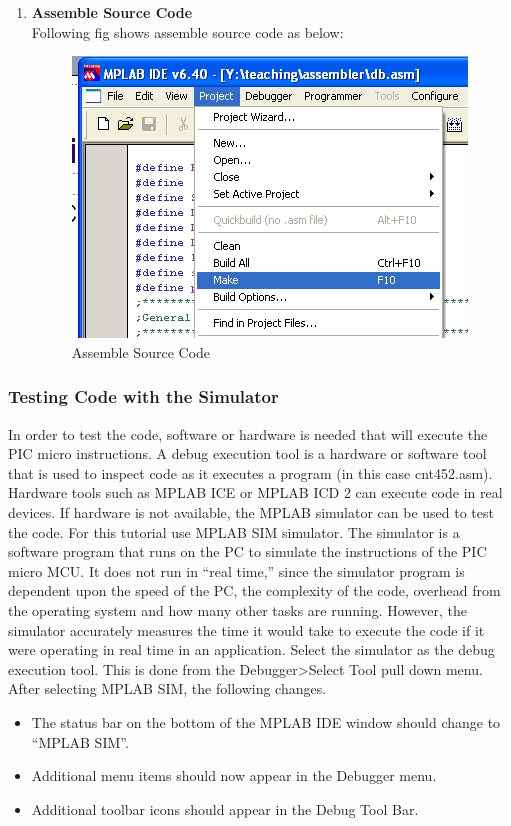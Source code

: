 \documentclass[12pt,a4paper,oneside,openright]{report}
\begin{document}
\begin{enumerate}
\item \textbf{Assemble Source Code}\\
Following fig shows assemble source code as below:
\begin{figure}[!h]
 \centering
 \includegraphics[width = .80\textwidth]{Figures/19.jpg}
 \caption{Assemble Source Code}
 \label{Assemble Source Code}
\end{figure}

\end{enumerate}
\subsubsection{Testing Code with the Simulator}
In order to test the code, software or hardware is needed that will execute the PIC micro instructions. A debug execution tool is a hardware or software tool that is used to inspect code as it executes a program (in this case cnt452.asm). Hardware tools such as MPLAB ICE or MPLAB ICD 2 can execute code in real devices. If hardware is not available, the MPLAB simulator can be used to test the code. For this tutorial use MPLAB SIM simulator. The simulator is a software program that runs on the PC to simulate the instructions of the PIC micro MCU. It does not run in “real time,” since the simulator program is dependent upon the speed of the PC, the complexity of the code, overhead from the operating system and how many other tasks are running. However, the simulator accurately measures the time it would take to execute the code if it were operating in real time in an application. Select the simulator as the debug execution tool. This is done from the Debugger>Select Tool pull down menu. After selecting MPLAB SIM, the following changes. 
\begin{itemize}
 \item The status bar on the bottom of the MPLAB IDE window should change to “MPLAB SIM”. 
\item Additional menu items should now appear in the Debugger menu. 
\item Additional toolbar icons should appear in the Debug Tool Bar.
\end{itemize}
\end{document}
